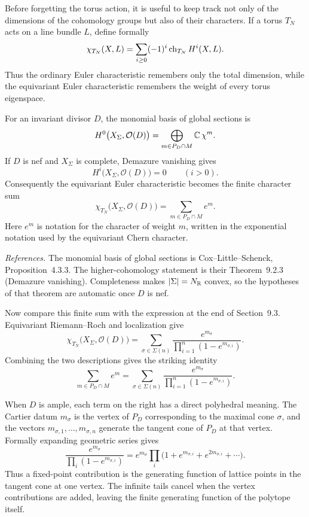 Before forgetting the torus action, it is useful to keep track not
only of the dimensions of the cohomology groups but also of their
characters.  If a torus \(T_N\) acts on a line bundle \(L\), define
formally
\[
\chi_{T_N}(X,L)
=
\sum_{i\geq0}(-1)^i\operatorname{ch}_{T_N}H^i(X,L).
\]
Thus the ordinary Euler characteristic remembers only the total
dimension, while the equivariant Euler characteristic remembers the
weight of every torus eigenspace.

For an invariant divisor \(D\), the monomial basis of global sections
is
\[
H^0\bigl(X_\Sigma,\mathcal O(D)\bigr)
=
\bigoplus_{m\in P_D\cap M}\mathbb{C}\,\chi^{m}.
\]
If \(D\) is nef and \(X_\Sigma\) is complete, Demazure vanishing gives
\[
H^i\bigl(X_\Sigma,\mathcal O(D)\bigr)=0
\qquad(i>0).
\]
Consequently the equivariant Euler characteristic becomes the finite
character sum
\[
\boxed{
\chi_{T_N}\bigl(X_\Sigma,\mathcal O(D)\bigr)
=
\sum_{m\in P_D\cap M}e^m.
}
\]
Here \(e^m\) is notation for the character of weight \(m\), written in
the exponential notation used by the equivariant Chern character.

\noindent
\textit{References.}
The monomial basis of global sections is Cox--Little--Schenck,
Proposition~4.3.3.  The higher-cohomology statement is their
Theorem~9.2.3 (Demazure vanishing).  Completeness makes
\(|\Sigma|=N_{\mathbb{R}}\) convex, so the hypotheses of that theorem are
automatic once \(D\) is nef.

Now compare this finite sum with the expression at the end of
Section~9.3.  Equivariant Riemann--Roch and localization give
\[
\chi_{T_N}\bigl(X_\Sigma,\mathcal O(D)\bigr)
=
\sum_{\sigma\in\Sigma(n)}
\frac{e^{m_\sigma}}
{\prod_{i=1}^n(1-e^{m_{\sigma,i}})}.
\]
Combining the two descriptions gives the striking identity
\begin{equation}
\boxed{
\sum_{m\in P_D\cap M}e^m
=
\sum_{\sigma\in\Sigma(n)}
\frac{e^{m_\sigma}}
{\prod_{i=1}^n(1-e^{m_{\sigma,i}})}.
}
\label{eq:toric-rr-character-identity}
\end{equation}

When \(D\) is ample, each term on the right has a direct polyhedral
meaning.  The Cartier datum \(m_\sigma\) is the vertex of \(P_D\)
corresponding to the maximal cone \(\sigma\), and the vectors
\(m_{\sigma,1},\ldots,m_{\sigma,n}\) generate the tangent cone of
\(P_D\) at that vertex.  Formally expanding geometric series gives
\[
\frac{e^{m_\sigma}}
{\prod_i(1-e^{m_{\sigma,i}})}
=
e^{m_\sigma}
\prod_i\bigl(1+e^{m_{\sigma,i}}+e^{2m_{\sigma,i}}+\cdots\bigr).
\]
Thus a fixed-point contribution is the generating function of lattice
points in the tangent cone at one vertex.  The infinite tails cancel
when the vertex contributions are added, leaving the finite generating
function of the polytope itself.


